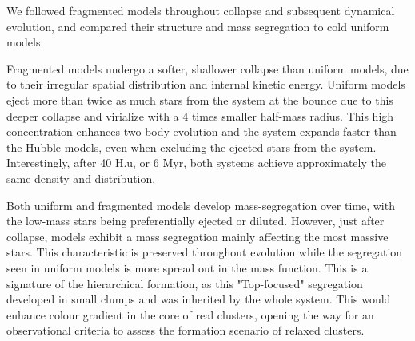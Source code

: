We followed \HubLem fragmented models throughout collapse and subsequent dynamical evolution, and compared their structure and mass segregation to cold uniform models. 

Fragmented models undergo a softer, shallower collapse than uniform models, due to their irregular spatial distribution and internal kinetic energy. Uniform models eject more than twice as much stars from the system at the bounce due to this deeper collapse and virialize with a 4 times smaller half-mass radius. This high concentration enhances two-body evolution and the system expands faster than the Hubble models, even when excluding the ejected stars from the system. Interestingly, after 40 H.u, or 6 Myr, both systems achieve approximately the same density and distribution.

Both uniform and fragmented models develop mass-segregation over time, with the low-mass stars being preferentially ejected or diluted. However, just after collapse, \HubLem models exhibit a mass segregation mainly affecting the most massive stars. This characteristic is preserved throughout evolution while the segregation seen in uniform models is more spread out in the mass function. This is  a signature of the hierarchical formation, as this "Top-focused" segregation developed in small clumps and was inherited by the whole system. This would enhance colour gradient in the core of real clusters, opening the way for an observational criteria to assess the formation scenario of relaxed clusters.






